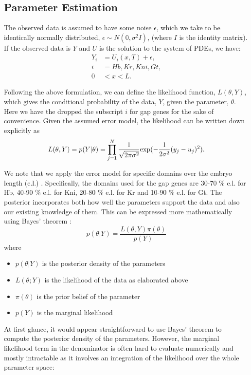 \subsection{Parameter Estimation}
The observed data is assumed to have some noise $\epsilon$, which we take to be identically normally distributed, $\epsilon \sim N(0, \sigma ^2I)$, (where $I$ is the identity matrix). If the observed data is $Y$ and $U$ is the solution to the system of PDEs, we have:
\begin{align*}
Y_{i} &= U_{i}(x,T) + \epsilon, \\
i &= Hb, Kr, Kni, Gt, \\
0 &< x < L.
\end{align*}

Following the above formulation, we can define the likelihood function, $L(\theta, Y)$, which gives the conditional probability of the data, $Y$, given the parameter, $\theta$. Here we have the dropped the subscript $i$ for gap genes for the sake of convenience. Given the assumed error model, the likelihood can be written down explicitly as 
$$L(\theta, Y) = p(Y | \theta)  = \prod_{j=1}^{N} \frac{1}{\sqrt{2 \pi \sigma ^2}} \textup{exp}(-\frac{1}{2 \sigma ^2}(y_j - u_j)^2).$$

We note that we apply the error model for specific domains over the embryo length (e.l.) . Specifically, the domains used for the gap genes are 30-70 \% e.l. for Hb, 40-90 \% e.l. for Kni, 20-80 \% e.l. for Kr and 10-90 \% e.l. for Gt. The posterior incorporates both how well the parameters support the data and also our existing knowledge of them. This can be expressed more mathematically using Bayes' theorem \cite{bayes63}:
$$p(\theta | Y) = \frac{L(\theta, Y) \pi(\theta )}{p(Y)}$$
where
\begin{itemize}
\item $p(\theta | Y)$ is the posterior density of the parameters
\item $L(\theta; Y)$ is the likelihood of the data as elaborated above
\item $\pi (\theta )$ is the prior belief of the parameter
\item $p(Y)$ is the marginal likelihood 
\end{itemize}

At first glance, it would appear straightforward to use Bayes' theorem to compute the posterior density of the parameters. However, the marginal likelihood term in the denominator is often hard to evaluate numerically and mostly intractable as it involves an integration of the likelihood over the whole parameter space:

